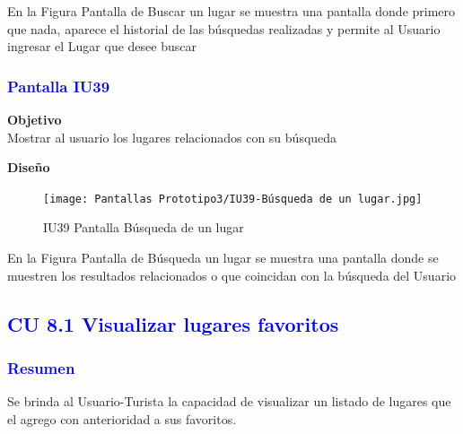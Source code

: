 En la Figura Pantalla de Buscar un lugar se muestra una pantalla donde primero que nada, aparece el historial de las búsquedas realizadas y permite al Usuario ingresar el Lugar que desee buscar

\subsubsection{\textcolor{blue}{Pantalla IU39}}

\textbf{Objetivo} \\
Mostrar al usuario los lugares relacionados con su búsqueda
\vspace{15pt}

\textbf{Diseño}

    \begin{figure}[h]
        
            \centering
            \texttt{[image: Pantallas Prototipo3/IU39-Búsqueda de un lugar.jpg]}
        \caption{IU39 Pantalla Búsqueda de un lugar}
    
    \end{figure}

En la Figura Pantalla de Búsqueda un lugar se muestra una pantalla donde se muestren los resultados relacionados o que coincidan con la búsqueda del Usuario


\pagebreak
\subsection{\textcolor{blue}{CU 8.1 Visualizar lugares favoritos}}

\subsubsection{\textcolor{blue}{Resumen}}{
Se brinda al Usuario-Turista la capacidad de visualizar un listado de lugares
que el agrego con anterioridad a sus favoritos.
}

